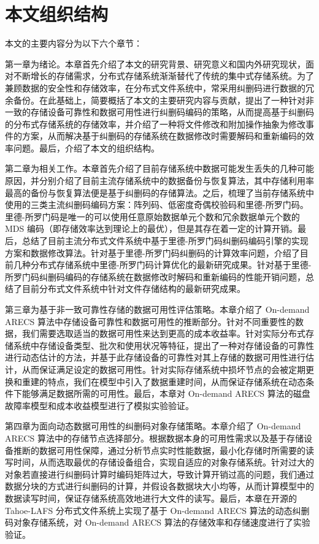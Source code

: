 \section{本文组织结构}
本文的主要内容分为以下六个章节：

第一章为绪论。本章首先介绍了本文的研究背景、研究意义和国内外研究现状，面对不断增长的存储需求，分布式存储系统渐渐替代了传统的集中式存储系统。为了兼顾数据的安全性和存储效率，在分布式文件系统中，常采用纠删码进行数据的冗余备份。在此基础上，简要概括了本文的主要研究内容与贡献，提出了一种针对非一致的存储设备可靠性和数据可用性进行纠删码编码的策略，从而提高基于纠删码的分布式存储系统的存储效率，并介绍了一种将文件修改和附加操作抽象为修改事件的方案，从而解决基于纠删码的存储系统在数据修改时需要解码和重新编码的效率问题。最后，介绍了本文的组织结构。

第二章为相关工作。本章首先介绍了目前存储系统中数据可能发生丢失的几种可能原因，并分别介绍了目前主流存储系统中的数据备份与恢复算法，其中存储利用率最高的备份与恢复算法便是基于纠删码的存储算法。之后，梳理了当前存储系统中使用的三类主流纠删码编码方案：阵列码、低密度奇偶校验码和里德-所罗门码。里德-所罗门码是唯一的可以使用任意原始数据单元个数和冗余数据单元个数的 MDS 编码（即存储效率达到理论上的最优），但是其存在着一定的计算开销。最后，总结了目前主流分布式文件系统中基于里德-所罗门码纠删码编码引擎的实现方案和数据修改算法。针对基于里德-所罗门码纠删码的计算效率问题，介绍了目前几种分布式存储系统中里德-所罗门码计算优化的最新研究成果。针对基于里德-所罗门码纠删码编码的存储系统在数据修改时解码和重新编码的性能开销问题，总结了目前分布式文件系统中针对文件存储结构的最新研究成果。

第三章为基于非一致可靠性存储的数据可用性评估策略。本章介绍了 On-demand ARECS 算法中存储设备可靠性和数据可用性的推断部分。针对不同重要性的数据，我们需要选取适当的数据可用性来达到更高的成本收益率。针对实际分布式存储系统中存储设备类型、批次和使用状况等特征，提出了一种对存储设备的可靠性进行动态估计的方法，并基于此存储设备的可靠性对其上存储的数据可用性进行估计，从而保证满足设定的数据可用性。针对实际存储系统中损坏节点的会被定期更换和重建的特点，我们在模型中引入了数据重建时间，从而保证存储系统在动态条件下能够满足数据所需的可用性。最后，本章对 On-demand ARECS 算法的磁盘故障率模型和成本收益模型进行了模拟实验验证。

第四章为面向动态数据可用性的纠删码对象存储策略。本章介绍了 On-demand ARECS 算法中的存储节点选择部分。根据数据本身的可用性需求以及基于存储设备推断的数据可用性保障，通过分析节点实时性能数据，最小化存储时所需要的读写时间，从而选取最优的存储设备组合，实现自适应的对象存储系统。针对过大的对象若直接进行纠删码计算时编码矩阵过大，导致计算开销过高的问题，我们通过数据分块的方式进行纠删码的计算，并假设各数据块大小均等，从而计算模型中的数据读写时间，保证存储系统高效地进行大文件的读写。最后，本章在开源的 Tahoe-LAFS 分布式文件系统上实现了基于 On-demand ARECS 算法的动态纠删码对象存储系统，对 On-demand ARECS 算法的存储效率和存储速度进行了实验验证。

